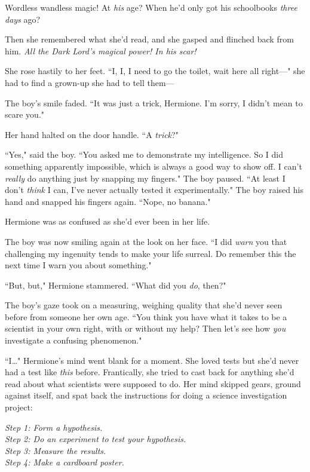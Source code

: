 Wordless wandless magic! At \emph{his} age? When he'd only got his schoolbooks \emph{three days} ago?

Then she remembered what she'd read, and she gasped and flinched back from him. \emph{All the Dark Lord's magical power! In his scar!}

She rose hastily to her feet. ``I, I, I need to go the toilet, wait here all right—" she had to find a grown-up she had to tell them—

The boy's smile faded. ``It was just a trick, Hermione. I'm sorry, I didn't mean to scare you."

Her hand halted on the door handle. ``A \emph{trick}?"

``Yes," said the boy. ``You asked me to demonstrate my intelligence. So I did something apparently impossible, which is always a good way to show off. I can't \emph{really} do anything just by snapping my fingers." The boy paused. ``At least I don't \emph{think} I can, I've never actually tested it experimentally." The boy raised his hand and snapped his fingers again. ``Nope, no banana."

Hermione was as confused as she'd ever been in her life.

The boy was now smiling again at the look on her face. ``I did \emph{warn} you that challenging my ingenuity tends to make your life surreal. Do remember this the next time I warn you about something."

``But, but," Hermione stammered. ``What did you \emph{do}, then?"

The boy's gaze took on a measuring, weighing quality that she'd never seen before from someone her own age. ``You think you have what it takes to be a scientist in your own right, with or without my help? Then let's see how \emph{you} investigate a confusing phenomenon."

``I…" Hermione's mind went blank for a moment. She loved tests but she'd never had a test like \emph{this} before. Frantically, she tried to cast back for anything she'd read about what scientists were supposed to do. Her mind skipped gears, ground against itself, and spat back the instructions for doing a science investigation project:

\emph{Step 1: Form a hypothesis.\\
Step 2: Do an experiment to test your hypothesis.\\
Step 3: Measure the results.\\
Step 4: Make a cardboard poster.}

